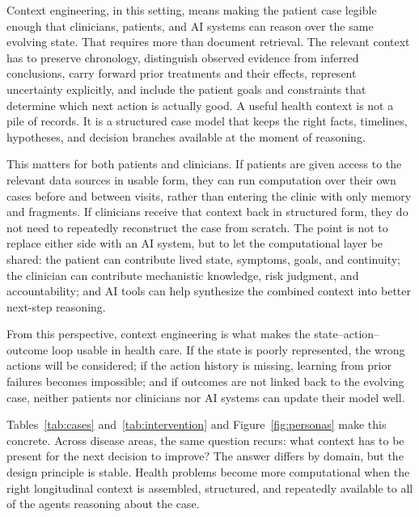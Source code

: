 \documentclass[11pt]{article}
\begin{document}
Context engineering, in this setting, means making the patient case legible enough that clinicians, patients, and AI systems can reason over the same evolving state. That requires more than document retrieval. The relevant context has to preserve chronology, distinguish observed evidence from inferred conclusions, carry forward prior treatments and their effects, represent uncertainty explicitly, and include the patient goals and constraints that determine which next action is actually good. A useful health context is not a pile of records. It is a structured case model that keeps the right facts, timelines, hypotheses, and decision branches available at the moment of reasoning.

This matters for both patients and clinicians. If patients are given access to the relevant data sources in usable form, they can run computation over their own cases before and between visits, rather than entering the clinic with only memory and fragments. If clinicians receive that context back in structured form, they do not need to repeatedly reconstruct the case from scratch. The point is not to replace either side with an AI system, but to let the computational layer be shared: the patient can contribute lived state, symptoms, goals, and continuity; the clinician can contribute mechanistic knowledge, risk judgment, and accountability; and AI tools can help synthesize the combined context into better next-step reasoning.

From this perspective, context engineering is what makes the state--action--outcome loop usable in health care. If the state is poorly represented, the wrong actions will be considered; if the action history is missing, learning from prior failures becomes impossible; and if outcomes are not linked back to the evolving case, neither patients nor clinicians nor AI systems can update their model well.

Tables~\ref{tab:cases} and~\ref{tab:intervention} and Figure~\ref{fig:personas} make this concrete. Across disease areas, the same question recurs: what context has to be present for the next decision to improve? The answer differs by domain, but the design principle is stable. Health problems become more computational when the right longitudinal context is assembled, structured, and repeatedly available to all of the agents reasoning about the case.
\end{document}
